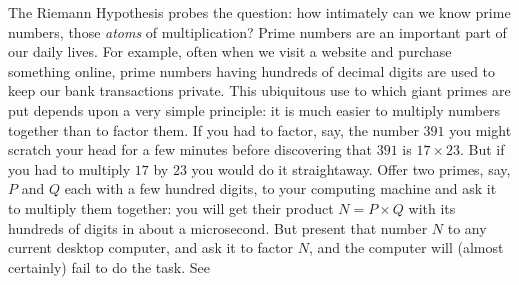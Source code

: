 \documentclass[openany]{book}
\theoremstyle{plain}
\theoremstyle{definition}
\newcommand{\RH}{Riemann Hypothesis\index{Riemann Hypothesis}}
\begin{document}
The \RH{} probes the question: how intimately can we know
prime numbers, those {\em atoms} of multiplication?  Prime numbers are
an important part of our daily lives.  For example, often when we visit a
website and purchase something online, prime numbers having hundreds of
decimal digits are used to keep our bank transactions private.  This
ubiquitous use to which giant primes are put depends upon a very
simple principle: it is much easier to multiply numbers together than
to factor them. If you had to factor, say, the number $391$ you might
scratch your head for a few minutes before discovering that $391$ is
$17\times 23$. But if you had to multiply $17$ by $23$ you would do it
straightaway.  Offer two primes, say, $P$ and $Q$ each with a few hundred
digits, to your computing machine and ask it to multiply them
together: you will get their product $N = P\times Q$ with its hundreds of digits
in about a microsecond. But present that number $N$ to any
current desktop computer, and ask it to factor $N$, and the computer
will (almost certainly) fail to do the task. See
\end{document}
